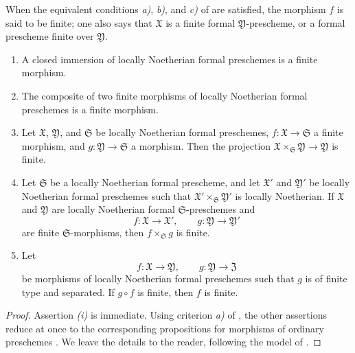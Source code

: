 \begin{definition}[4.8.2]
\label{III.4.8.2}
When the equivalent conditions \emph{a)}, \emph{b)}, and \emph{c)}
of  are satisfied, the morphism $f$ is said to be
finite; one also says that $\mathfrak{X}$ is a
finite formal $\mathfrak{Y}$-prescheme, or a formal
prescheme finite over $\mathfrak{Y}$.
\end{definition}

\begin{proposition}[4.8.3]
\label{III.4.8.3}
\begin{enumerate}
  \item[\rm{(i)}] A closed immersion of locally Noetherian formal
    preschemes is a finite morphism.
  \item[\rm{(ii)}] The composite of two finite morphisms of locally
    Noetherian formal preschemes is a finite morphism.
  \item[\rm{(iii)}] Let $\mathfrak{X}$, $\mathfrak{Y}$, and
    $\mathfrak{S}$ be locally Noetherian formal preschemes,
    $f:\mathfrak{X}\to\mathfrak{S}$ a finite morphism, and
    $g:\mathfrak{Y}\to\mathfrak{S}$ a morphism.  Then the projection $\mathfrak{X}\times_{\mathfrak{S}}\mathfrak{Y}
\longrightarrow\mathfrak{Y}$
    is finite.
  \item[\rm{(iv)}] Let $\mathfrak{S}$ be a locally Noetherian formal
    prescheme, and let $\mathfrak{X}'$ and $\mathfrak{Y}'$ be
    locally Noetherian formal preschemes such that
    $\mathfrak{X}'\times_{\mathfrak{S}}\mathfrak{Y}'$ is locally
    Noetherian.  If $\mathfrak{X}$ and $\mathfrak{Y}$ are locally
    Noetherian formal $\mathfrak{S}$-preschemes and
    \[
      f:\mathfrak{X}\to\mathfrak{X}',\qquad
      g:\mathfrak{Y}\to\mathfrak{Y}'
    \]
    are finite $\mathfrak{S}$-morphisms, then
    $f\times_{\mathfrak{S}}g$ is finite.
  \item[\rm{(v)}] Let
    \[
      f:\mathfrak{X}\to\mathfrak{Y},\qquad
      g:\mathfrak{Y}\to\mathfrak{Z}
    \]
    be morphisms of locally Noetherian formal preschemes such that
    $g$ is of finite type and separated.  If $g\circ f$ is finite,
    then $f$ is finite.
\end{enumerate}
\end{proposition}

\begin{proof}
Assertion \emph{(i)} is immediate.  Using criterion \emph{a)} of
, the other assertions reduce at once to the
corresponding propositions for morphisms of ordinary preschemes
.  We leave the details to the reader, following
the model of .
\end{proof}

